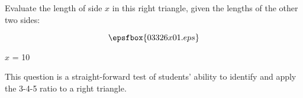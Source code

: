 

Evaluate the length of side $x$ in this right triangle, given the lengths of the other two sides:

$$\epsfbox{03326x01.eps}$$







$x$ = 10







This question is a straight-forward test of students' ability to identify and apply the 3-4-5 ratio to a right triangle.




